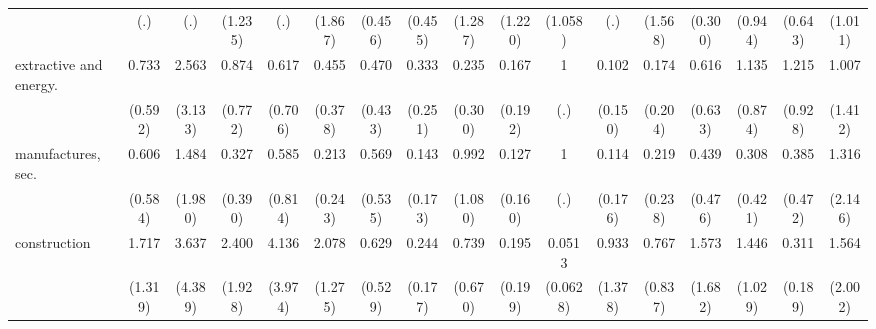 {\begin{tabular}{l*{16}{c}}
                    &         (.)         &         (.)         &     (1.235)         &         (.)         &     (1.867)         &     (0.456)         &     (0.455)         &     (1.287)         &     (1.220)         &     (1.058)         &         (.)         &     (1.568)         &     (0.300)         &     (0.944)         &     (0.643)         &     (1.011)         \\
[1em]
extractive and energy.&       0.733         &       2.563         &       0.874         &       0.617         &       0.455         &       0.470         &       0.333         &       0.235         &       0.167         &           1         &       0.102         &       0.174         &       0.616         &       1.135         &       1.215         &       1.007         \\
                    &     (0.592)         &     (3.133)         &     (0.772)         &     (0.706)         &     (0.378)         &     (0.433)         &     (0.251)         &     (0.300)         &     (0.192)         &         (.)         &     (0.150)         &     (0.204)         &     (0.633)         &     (0.874)         &     (0.928)         &     (1.412)         \\
[1em]
manufactures, sec.  &       0.606         &       1.484         &       0.327         &       0.585         &       0.213         &       0.569         &       0.143         &       0.992         &       0.127         &           1         &       0.114         &       0.219         &       0.439         &       0.308         &       0.385         &       1.316         \\
                    &     (0.584)         &     (1.980)         &     (0.390)         &     (0.814)         &     (0.243)         &     (0.535)         &     (0.173)         &     (1.080)         &     (0.160)         &         (.)         &     (0.176)         &     (0.238)         &     (0.476)         &     (0.421)         &     (0.472)         &     (2.146)         \\
[1em]
construction        &       1.717         &       3.637         &       2.400         &       4.136         &       2.078         &       0.629         &       0.244         &       0.739         &       0.195         &      0.0513\sym{*}  &       0.933         &       0.767         &       1.573         &       1.446         &       0.311         &       1.564         \\
                    &     (1.319)         &     (4.389)         &     (1.928)         &     (3.974)         &     (1.275)         &     (0.529)         &     (0.177)         &     (0.670)         &     (0.199)         &    (0.0628)         &     (1.378)         &     (0.837)         &     (1.682)         &     (1.029)         &     (0.189)         &     (2.002)         \\

\end{tabular}}
